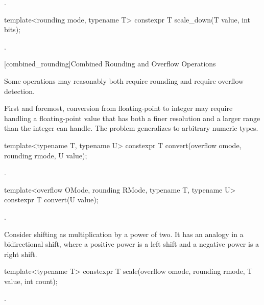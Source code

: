 \begin{addedblock}
\begin{itemdescr}
\returns {}.
\end{itemdescr}

\begin{itemdecl}
template<rounding mode, typename T>
constexpr T scale_down(T value, int bits);
\end{itemdecl}

\begin{itemdescr}
\returns {}.
\end{itemdescr}

[combined_rounding]{Combined Rounding and Overflow Operations}

Some operations may reasonably both require rounding and require overflow detection.

First and foremost, conversion from floating-point to integer may require handling a floating-point value that has both a finer resolution and a larger range than the integer can handle. The problem generalizes to arbitrary numeric types.

\begin{itemdecl}
template<typename T, typename U>
constexpr T convert(overflow omode, rounding rmode, U value);
\end{itemdecl}

\begin{itemdescr}
\returns {}.
\end{itemdescr}

\begin{itemdecl}
template<overflow OMode, rounding RMode, typename T, typename U>
constexpr T convert(U value);
\end{itemdecl}

\begin{itemdescr}
\returns {}.
\end{itemdescr}

Consider shifting as multiplication by a power of two. It has an analogy in a bidirectional shift, where a positive power is a left shift and a negative power is a right shift.

\begin{itemdecl}
template<typename T>
constexpr T scale(overflow omode, rounding rmode, T value, int count);
\end{itemdecl}

\begin{itemdescr}
\returns {}.
\end{itemdescr}


\end{addedblock}
